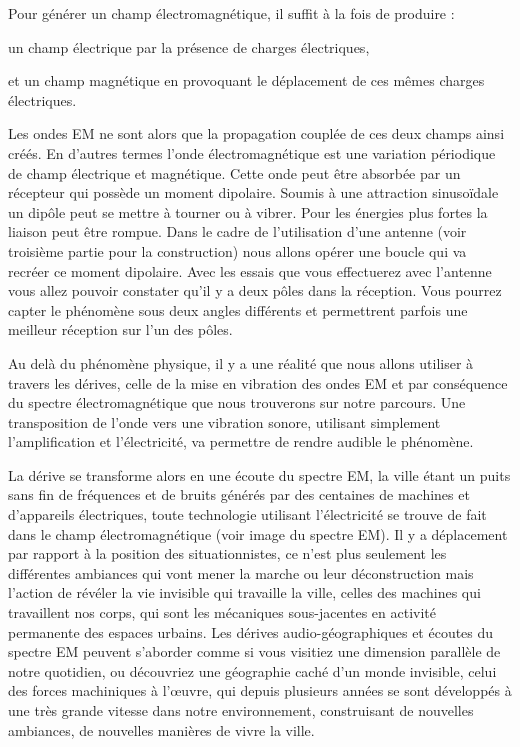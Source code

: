 {Pour g\'en\'erer un champ \'electromagn\'etique, il suffit \`a la fois
de produire : 

\startitemize
\item un champ \'electrique par la pr\'esence de charges \'electriques,
\item et un champ magn\'etique en provoquant le d\'eplacement de ces
m\^emes charges \'electriques. 
\stopitemize

Les ondes EM ne sont alors que la propagation coupl\'ee de ces deux
champs ainsi cr\'e\'es. En d'autres termes l'onde \'electromagn\'etique est une variation p\'eriodique de champ
\'electrique et magn\'etique. Cette onde peut \^etre absorb\'ee par un
r\'ecepteur qui poss\`ede un moment dipolaire. Soumis \`a une
attraction sinuso\"idale un dip\^ole peut se mettre \`a tourner ou \`a
vibrer. Pour les \'energies plus fortes la liaison peut \^etre rompue.
Dans le cadre de l'utilisation d'une
antenne (voir troisi\`eme partie pour la construction) nous allons
op\'erer une boucle qui va recr\'eer ce moment dipolaire. Avec les
essais que vous effectuerez avec l'antenne vous allez
pouvoir constater qu'il y a deux p\^oles dans la
r\'eception. Vous pourrez capter le ph\'enom\`ene sous deux angles
diff\'erents et permettrent parfois une meilleur r\'eception sur
l'un des p\^oles.

Au del\`a du ph\'enom\`ene physique, il y a une r\'ealit\'e que nous
allons utiliser \`a travers les d\'erives, celle de la mise en
vibration des ondes EM et par cons\'equence du spectre
\'electromagn\'etique que nous trouverons sur notre parcours. Une
transposition de l'onde vers une vibration sonore,
utilisant simplement l'amplification et
l'\'electricit\'e, va permettre de rendre audible le
ph\'enom\`ene.

La d\'erive se transforme alors en une \'ecoute du spectre EM, la ville
\'etant un puits sans fin de fr\'equences et de bruits g\'en\'er\'es
par des centaines de machines et d'appareils
\'electriques, toute technologie utilisant
l'\'electricit\'e se trouve de fait dans le champ
\'electromagn\'etique (voir image du spectre EM). Il y a d\'eplacement
par rapport \`a la position des situationnistes, ce
n'est plus seulement les diff\'erentes ambiances qui
vont mener la marche ou leur d\'econstruction mais
l'action de r\'ev\'eler la vie invisible qui travaille
la ville, celles des machines qui travaillent nos corps, qui sont les
m\'ecaniques sous{}-jacentes en activit\'e permanente des espaces
urbains. Les d\'erives audio{}-g\'eographiques et \'ecoutes du spectre
EM peuvent s'aborder comme si vous visitiez une
dimension parall\`ele de notre quotidien, ou d\'ecouvriez une
g\'eographie cach\'e d'un monde invisible, celui des
forces machiniques \`a l'{\oe}uvre, qui depuis plusieurs
ann\'ees se sont d\'evelopp\'es \`a une tr\`es grande vitesse dans
notre environnement, construisant de nouvelles ambiances, de nouvelles
mani\`eres de vivre la ville.

}
